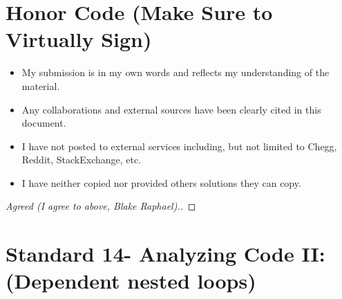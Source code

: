 \documentclass[11pt]{article}
\theoremstyle{definition}
\theoremstyle{definition}
\theoremstyle{definition}
\begin{document}
\section{Honor Code (Make Sure to Virtually Sign)} \label{HonorCode}

\begin{itemize}
\item My submission is in my own words and reflects my understanding of the material.
\item Any collaborations and external sources have been clearly cited in this document.
\item I have not posted to external services including, but not limited to Chegg, Reddit, StackExchange, etc.
\item I have neither copied nor provided others solutions they can copy.
\end{itemize}


\begin{proof}[Agreed (I agree to above, Blake Raphael).]
\end{proof}
\newpage
\section{Standard 14- Analyzing Code II: (Dependent nested loops)}
\end{document}
